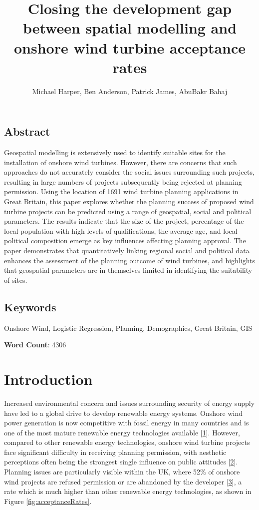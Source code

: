 \documentclass[a4paper,]{article}
\title{Closing the development gap between spatial modelling and onshore wind
turbine acceptance rates}
\author{Michael Harper, Ben Anderson, Patrick James, AbuBakr Bahaj}
\date{}
\theoremstyle{definition}
\theoremstyle{definition}
\theoremstyle{definition}
\theoremstyle{remark}
\begin{document}
\maketitle

\subsection*{Abstract}\label{abstract}

Geospatial modelling is extensively used to identify suitable sites for
the installation of onshore wind turbines. However, there are concerns
that such approaches do not accurately consider the social issues
surrounding such projects, resulting in large numbers of projects
subsequently being rejected at planning permission. Using the location
of 1691 wind turbine planning applications in Great Britain, this paper
explores whether the planning success of proposed wind turbine projects
can be predicted using a range of geospatial, social and political
parameters. The results indicate that the size of the project,
percentage of the local population with high levels of qualifications,
the average age, and local political composition emerge as key
influences affecting planning approval. The paper demonstrates that
quantitatively linking regional social and political data enhances the
assessment of the planning outcome of wind turbines, and highlights that
geospatial parameters are in themselves limited in identifying the
suitability of sites.

\subsection*{Keywords}\label{keywords}

Onshore Wind, Logistic Regression, Planning, Demographics, Great
Britain, GIS

\textbf{Word Count}: 4306

\section{Introduction}\label{introduction}

Increased environmental concern and issues surrounding security of
energy supply have led to a global drive to develop renewable energy
systems. Onshore wind power generation is now competitive with fossil
energy in many countries and is one of the most mature renewable energy
technologies available {[}\protect\hyperlink{ref-UNEP2016}{1}{]}.
However, compared to other renewable energy technologies, onshore wind
turbine projects face significant difficulty in receiving planning
permission, with aesthetic perceptions often being the strongest single
influence on public attitudes
{[}\protect\hyperlink{ref-Wolsink2000}{2}{]}. Planning issues are
particularly visible within the UK, where 52\% of onshore wind projects
are refused permission or are abandoned by the developer
{[}\protect\hyperlink{ref-DECC2016}{3}{]}, a rate which is much higher
than other renewable energy technologies, as shown in Figure
\ref{fig:acceptanceRates}.
\end{document}
